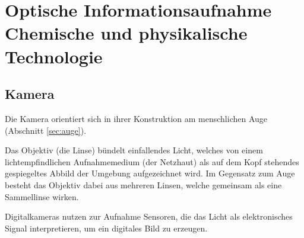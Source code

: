 \section[Optische Informationsaufnahme\hfill Chemische und physikalische Technologie]{Optische Informationsaufnahme\\{\normalsize Chemische und physikalische Technologie}}
\subsection{Kamera}
Die Kamera orientiert sich in ihrer Konstruktion am menschlichen Auge (Abschnitt \ref{sec:auge}). 

Das Objektiv (die Linse) bündelt einfallendes Licht, welches von einem lichtempfindlichen Aufnahmemedium (der Netzhaut) als auf dem Kopf stehendes gespiegeltes Abbild der Umgebung aufgezeichnet wird. Im Gegensatz zum Auge besteht das Objektiv dabei aus mehreren Linsen, welche gemeinsam als eine Sammellinse wirken.

Digitalkameras nutzen zur Aufnahme Sensoren, die das Licht als elektronisches Signal interpretieren, um ein digitales Bild zu erzeugen.